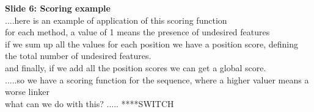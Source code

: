 \documentclass[a4paper,10pt]{article}
\begin{document}











\textbf{Slide 6: Scoring example}\\
....here is an example of application of this scoring function\\
for each method, a value of 1 means the presence of undesired features\\
if we sum up all the values for each position we have a position score, defining the total number of undesired features.\\
and finally, if we add all the position scores we can get a global score.\\
.....so we have a scoring function for the sequence, where a higher valuer means a worse linker\\
 what can we do with this? ..... ****SWITCH\\
\end{document}
